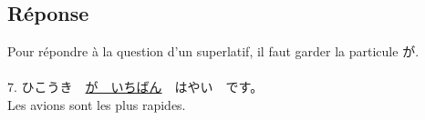 \documentclass[11pt]{report}
\newenvironment{Japanese}{%
\CJKfamily{min}%
\CJKtilde  
\CJKnospace}{}
\begin{document}
\subsection{Réponse}

\begin{CJK}{UTF8}{}  
\begin{Japanese}
	Pour répondre \`a la question d'un superlatif, il faut garder la particule が. \\ \\
	7. ひこうき　\underline{が　いちばん}　はやい　です。 \\
	Les avions sont les plus rapides.
	
\end{Japanese}  
\end{CJK}
\end{document}

